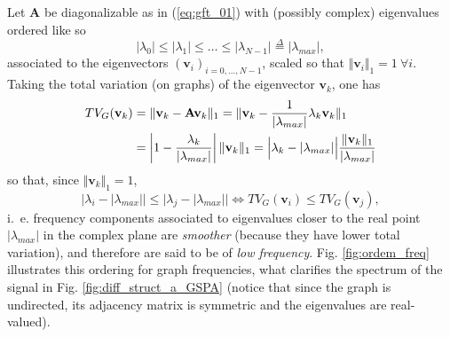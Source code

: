 Let $ \mathbf{A} $ be diagonalizable as in (\ref{eq:gft_01}) with (possibly complex) eigenvalues ordered like so
\begin{equation}
\label{eq:eig_order}
|\lambda_0| \leq |\lambda_1| \leq \dots \leq |\lambda_{N-1}| \overset{\Delta}{=} |\lambda_{max}|,
\end{equation}
associated to the eigenvectors $ (\mathbf{v}_i)_{i=0,\dots,N-1} $, scaled so that $ \Vert \mathbf{v}_i \Vert_1 = 1  \ \forall i$. Taking the total variation (on graphs) of the eigenvector $ \mathbf{v}_k $, one has
\begin{align*}
TV_G(\mathbf{v}_k) &= \Vert \mathbf{v}_k - \mathbf{A} \mathbf{v}_k \Vert_1  = \Vert\mathbf{v}_k - \frac{1}{|\lambda_{max}|} \lambda_k \mathbf{v}_k \Vert_1 \notag \\
&= \left|1 - \frac{\lambda_k}{|\lambda_{max}|}\right| \Vert \mathbf{v}_k \Vert_1 = \Big| \lambda_k - |\lambda_{max}| \Big| \frac{\Vert \mathbf{v}_k \Vert_{1}}{|\lambda_{max}|}
\end{align*}
so that, since $ \Vert \mathbf{v}_k \Vert_1 = 1 $,
\begin{equation}
\label{eq:TV_ordering}
\Big| \! \lambda_i  - \! |\lambda_{max}|\Big| \! \leq \! \Big|  \lambda_j  - \! |\lambda_{max}|\Big| \! \! \iff \! \! TV_G(\mathbf{v}_i) \leq TV_G(\mathbf{v}_j),
\end{equation}
i.~e. frequency components associated to eigenvalues closer to the real point $ |\lambda_{max}| $ in the complex plane are \emph{smoother} (because they have lower total variation), and therefore are said to be of \emph{low frequency}. Fig. \ref{fig:ordem_freq} illustrates this ordering for graph frequencies, what clarifies the spectrum of the signal in Fig. \ref{fig:diff_struct_a_GSPA} (notice that since the graph is undirected, its adjacency matrix is symmetric and the eigenvalues are real-valued).


